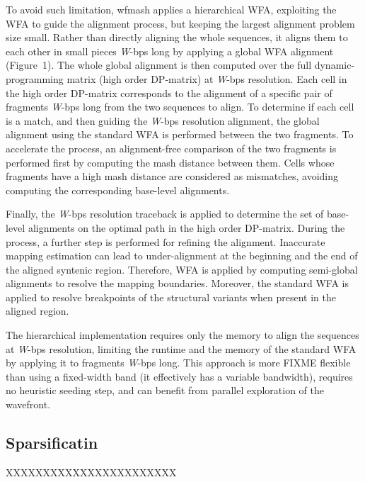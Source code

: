 \documentclass{bioinfo}
\theoremstyle{definition}
\begin{document}
To avoid such limitation, wfmash applies a hierarchical WFA, exploiting the WFA to guide the alignment process, but keeping the largest alignment problem size small.
Rather than directly aligning the whole sequences, it aligns them to each other in small pieces \textit{W}-bps long by applying a global WFA alignment (Figure~1\vphantom{\ref{fig:1}}).
The whole global alignment is then computed over the full dynamic-programming matrix (high order DP-matrix) at \textit{W}-bps resolution.
Each cell in the high order DP-matrix corresponds to the alignment of a specific pair of fragments \textit{W}-bps long from the two sequences to align.
To determine if each cell is a match, and then guiding the \textit{W}-bps resolution alignment, the global alignment using the standard WFA is performed between the two fragments.
To accelerate the process, an alignment-free comparison of the two fragments is performed first by computing the mash distance between them.
Cells whose fragments have a high mash distance are considered as mismatches, avoiding computing the corresponding base-level alignments.

Finally, the \textit{W}-bps resolution traceback is applied to determine the set of base-level alignments on the optimal path in the high order DP-matrix.
During the process, a further step is performed for refining the alignment.
Inaccurate mapping estimation can lead to under-alignment at the beginning and the end of the aligned syntenic region.
Therefore, WFA is applied by computing semi-global alignments to resolve the mapping boundaries.
Moreover, the standard WFA is applied to resolve breakpoints of the structural variants when present in the aligned region.

The hierarchical implementation requires only the memory to align the sequences at \textit{W}-bps resolution, limiting the runtime and the memory of the standard WFA by applying it to fragments \textit{W}-bps long.
This approach is more FIXME flexible than using a fixed-width band (it effectively has a variable bandwidth), requires no heuristic seeding step, and can benefit from parallel exploration of the wavefront.



\subsection{Sparsificatin}
XXXXXXXXXXXXXXXXXXXXXXX
\end{document}
